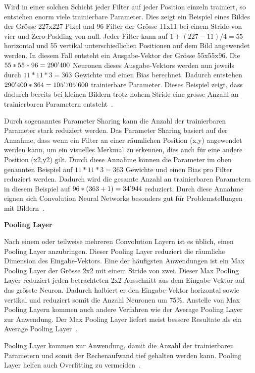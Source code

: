 Wird in einer solchen Schicht jeder Filter auf jeder Position einzeln trainiert, so entstehen enorm viele trainierbare Parameter. Dies zeigt ein Beispiel eines Bildes der Grösse 227x227 Pixel und 96 Filter der Grösse 11x11 bei einem Stride von vier und Zero-Padding von null. Jeder Filter kann auf $1+(227-11)/4 = 55$ horizontal und 55 vertikal unterschiedlichen Positionen auf dem Bild angewendet werden. In diesem Fall entsteht ein Ausgabe-Vektor der Grösse 55x55x96. Die $55*55*96 = 290\textnormal{'}400$ Neuronen dieses Ausgabe-Vektors werden nun jeweils durch $11*11*3 = 363$ Gewichte und einen Bias berechnet. Dadurch entstehen $290'400*364 = 105\textnormal{'}705\textnormal{'}600$ trainierbare Parameter. Dieses Beispiel zeigt, dass dadurch bereits bei kleinen Bildern trotz hohem Stride eine grosse Anzahl an trainierbaren Parametern entsteht~\autocite{CNN}.

Durch sogenanntes Parameter Sharing kann die Anzahl der trainierbaren Parameter stark reduziert werden. Das Parameter Sharing basiert auf der Annahme, dass wenn ein Filter an einer räumlichen Position (x,y) angewendet werden kann, um ein visuelles Merkmal zu erkennen, dies auch für eine andere Position (x2,y2) gilt. Durch diese Annahme können die Parameter im oben genannten Beispiel auf $11*11*3 = 363$ Gewichte und einen Bias pro Filter reduziert werden. Dadurch wird die gesamte Anzahl an trainierbaren Parametern in diesem Beispiel auf $96*(363+1) = 34\textnormal{'}944$ reduziert. Durch diese Annahme eignen sich Convolution Neural Networks besonders gut für Problemstellungen mit Bildern~\autocite{CNN}. 

\textbf{Pooling Layer}

\nopagebreak

Nach einem oder teilweise mehreren Convolution Layern ist es üblich, einen Pooling Layer anzubringen. Dieser Pooling Layer reduziert die räumliche Dimension des Eingabe-Vektors. Eine der häufigsten Anwendungen ist ein Max Pooling Layer der Grösse 2x2 mit einem Stride von zwei. Dieser Max Pooling Layer reduziert jeden betrachteten 2x2 Ausschnitt aus dem Eingabe-Vektor auf das grösste Neuron. Dadurch halbiert er den Eingabe-Vektor horizontal sowie vertikal und reduziert somit die Anzahl Neuronen um 75\%. Anstelle von Max Pooling Layern kommen auch andere Verfahren wie der Average Pooling Layer zur Anwendung. Der Max Pooling Layer liefert meist bessere Resultate als ein Average Pooling Layer~\autocite{CNN}.

Pooling Layer kommen zur Anwendung, damit die Anzahl der trainierbaren Parametern und somit der Rechenaufwand tief gehalten werden kann. Pooling Layer helfen auch Overfitting zu vermeiden~\autocite{CNN}.

